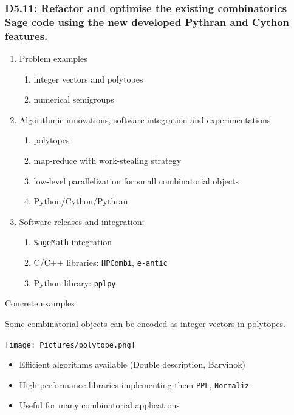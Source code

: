\documentclass{beamer}
\begin{document}
\begin{frame}
  \frametitle{D5.11: Refactor and optimise the existing combinatorics Sage code using the new developed Pythran and Cython features.}

  \begin{enumerate}
  \item Problem examples
    \begin{enumerate}
    \item integer vectors and polytopes
    \item numerical semigroups
    \end{enumerate}
  \item Algorithmic innovations, software integration and experimentations
    \begin{enumerate}
    \item polytopes
    \item map-reduce with work-stealing strategy
    \item low-level parallelization for small combinatorial objects
    \item Python/Cython/Pythran
    \end{enumerate}
  \item Software releases and integration:
    \begin{enumerate}
    \item \texttt{SageMath} integration
    \item C/C++ libraries: \texttt{HPCombi}, \texttt{e-antic}
    \item Python library: \texttt{pplpy}
    \end{enumerate}
  \end{enumerate}

\end{frame}


\begin{frame}{Concrete examples}
  \begin{example}
  Some combinatorial objects can be encoded as integer vectors in polytopes.
  \begin{center}\texttt{[image: Pictures/polytope.png]}\end{center}
  \end{example}

   \begin{itemize}
   \item Efficient algorithms available (Double description, Barvinok)
   \item High performance libraries implementing them \texttt{PPL}, \texttt{Normaliz}
   \item Useful for many combinatorial applications
   \end{itemize}
\end{frame}
\end{document}
